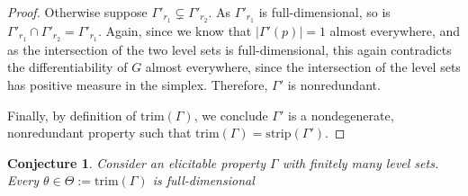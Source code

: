 \documentclass[12pt]{article}
\newcommand{\R}{\mathcal{R}}
\newcommand{\trim}{\mathrm{trim}}
\newcommand{\strip}{\mathrm{strip}}
\newtheorem{conjecture}{Conjecture}
\begin{document}
\begin{proof}
	
	Otherwise suppose $\Gamma'_{r_1} \subsetneq \Gamma'_{r_2}$.
	As $\Gamma'_{r_1}$ is full-dimensional, so is $\Gamma'_{r_1} \cap \Gamma'_{r_2} = \Gamma'_{r_1}$.
	Again, since we know that $|\Gamma'(p)| = 1$ almost everywhere, and as the intersection of the two level sets is full-dimensional, this again contradicts the differentiability of $G$ almost everywhere, since the intersection of the level sets has positive measure in the simplex.
	Therefore, $\Gamma'$ is nonredundant.

		
	Finally, by definition of $\trim(\Gamma)$, we conclude $\Gamma'$ is a nondegenerate, nonredundant property such that $\trim(\Gamma) = \strip(\Gamma')$.
	
\end{proof}


\begin{conjecture}\label{conj:trim-full-dim}
	Consider an elicitable property $\Gamma$ with finitely many level sets.
	Every $\theta \in \Theta := \trim(\Gamma)$ is full-dimensional  
\end{conjecture}
\end{document}
